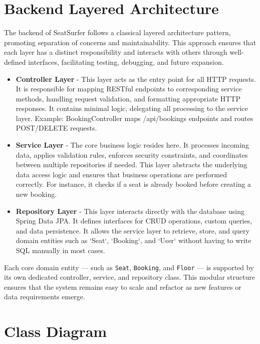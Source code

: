 \documentclass[12pt,a4paper]{report}
\begin{document}
\section{Backend Layered Architecture}

The backend of SeatSurfer follows a classical layered architecture pattern, promoting separation of concerns and maintainability. This approach ensures that each layer has a distinct responsibility and interacts with others through well-defined interfaces, facilitating testing, debugging, and future expansion.

\begin{itemize}
\item \textbf{Controller Layer} - This layer acts as the entry point for all HTTP requests. It is responsible for mapping RESTful endpoints to corresponding service methods, handling request validation, and formatting appropriate HTTP responses. It contains minimal logic, delegating all processing to the service layer. Example: BookingController maps /api/bookings endpoints and routes POST/DELETE requests.
\item \textbf{Service Layer} - The core business logic resides here. It processes incoming data, applies validation rules, enforces security constraints, and coordinates between multiple repositories if needed. This layer abstracts the underlying data access logic and ensures that business operations are performed correctly. For instance, it checks if a seat is already booked before creating a new booking.
\item \textbf{Repository Layer} - This layer interacts directly with the database using Spring Data JPA. It defines interfaces for CRUD operations, custom queries, and data persistence. It allows the service layer to retrieve, store, and query domain entities such as `Seat`, `Booking`, and `User` without having to write SQL manually in most cases.
\end{itemize}

Each core domain entity — such as \texttt{Seat}, \texttt{Booking}, and \texttt{Floor} — is supported by its own dedicated controller, service, and repository class. This modular structure ensures that the system remains easy to scale and refactor as new features or data requirements emerge.

\section{Class Diagram}
\end{document}

